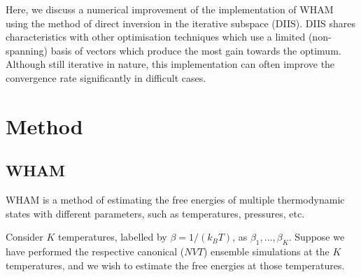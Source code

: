 \documentclass{gMOS2e}
\begin{document}
Here, we discuss a numerical improvement of
the implementation of WHAM using
the method of direct inversion in the iterative subspace (DIIS)\cite{
pulay1980, pulay1982, hamilton1986,
kovalenko1999, howard2011}.
%
DIIS shares characteristics with other optimisation techniques which use a limited (non-spanning) basis of vectors which produce the most gain towards the optimum.
%
Although still iterative in nature,
this implementation
can often improve
the convergence rate
significantly in difficult cases.





\section{Method}





\subsection{WHAM}



WHAM is a method of
estimating the free energies
of multiple thermodynamic states
with different parameters,
such as temperatures, pressures, etc.
%




Consider $K$ temperatures,
labelled by
$\beta = 1/(k_B T)$,
as
$\beta_1, \ldots, \beta_K$.
%
Suppose we have performed the respective
canonical ($NVT$) ensemble simulations
at the $K$ temperatures, and
we wish to estimate the free energies
at those temperatures.
\end{document}

